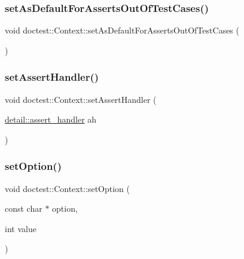 \subsubsection{\texorpdfstring{set\+As\+Default\+For\+Asserts\+Out\+Of\+Test\+Cases()}{setAsDefaultForAssertsOutOfTestCases()}}
{\footnotesize\ttfamily void doctest\+::\+Context\+::set\+As\+Default\+For\+Asserts\+Out\+Of\+Test\+Cases (\begin{DoxyParamCaption}{ }\end{DoxyParamCaption})}

\mbox{\label{classdoctest_1_1_context_a669dd0a596a611eeb0decdb78b661a90}} 
\subsubsection{\texorpdfstring{set\+Assert\+Handler()}{setAssertHandler()}}
{\footnotesize\ttfamily void doctest\+::\+Context\+::set\+Assert\+Handler (\begin{DoxyParamCaption}\item[{\mbox{\hyperlink{namespacedoctest_1_1detail_a5b5db6997f20389de5735e3ee3439b95}{detail\+::assert\+\_\+handler}}}]{ah }\end{DoxyParamCaption})}

\mbox{\label{classdoctest_1_1_context_a95e7a0230c5897f0eae36718f51d2f05}} 
\subsubsection{\texorpdfstring{set\+Option()}{setOption()}\hspace{0.1cm}{\footnotesize\ttfamily [1/2]}}
{\footnotesize\ttfamily void doctest\+::\+Context\+::set\+Option (\begin{DoxyParamCaption}\item[{const char $\ast$}]{option,  }\item[{int}]{value }\end{DoxyParamCaption})}

\mbox{\label{classdoctest_1_1_context_a4352ffc196c4ba56045270e45baa2754}} 
